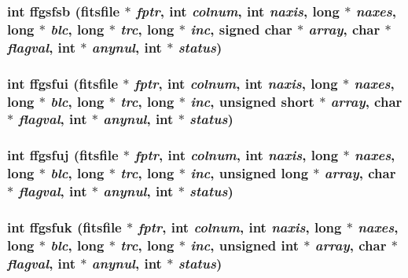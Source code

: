 \subsubsection{\setlength{\rightskip}{0pt plus 5cm}int ffgsfsb (\bf{fitsfile} $\ast$ {\em fptr}, int {\em colnum}, int {\em naxis}, long $\ast$ {\em naxes}, long $\ast$ {\em blc}, long $\ast$ {\em trc}, long $\ast$ {\em inc}, signed char $\ast$ {\em array}, char $\ast$ {\em flagval}, int $\ast$ {\em anynul}, int $\ast$ {\em status})}\label{test_2roimasker_2fitsio_8h_e824866f99503c243fed85e3cce3aaf4}


\subsubsection{\setlength{\rightskip}{0pt plus 5cm}int ffgsfui (\bf{fitsfile} $\ast$ {\em fptr}, int {\em colnum}, int {\em naxis}, long $\ast$ {\em naxes}, long $\ast$ {\em blc}, long $\ast$ {\em trc}, long $\ast$ {\em inc}, unsigned short $\ast$ {\em array}, char $\ast$ {\em flagval}, int $\ast$ {\em anynul}, int $\ast$ {\em status})}\label{test_2roimasker_2fitsio_8h_c591c8ea9be72a7c242e8f102f6ba3b4}


\subsubsection{\setlength{\rightskip}{0pt plus 5cm}int ffgsfuj (\bf{fitsfile} $\ast$ {\em fptr}, int {\em colnum}, int {\em naxis}, long $\ast$ {\em naxes}, long $\ast$ {\em blc}, long $\ast$ {\em trc}, long $\ast$ {\em inc}, unsigned long $\ast$ {\em array}, char $\ast$ {\em flagval}, int $\ast$ {\em anynul}, int $\ast$ {\em status})}\label{test_2roimasker_2fitsio_8h_60eb38f1f62e5060ffca964466dd248e}


\subsubsection{\setlength{\rightskip}{0pt plus 5cm}int ffgsfuk (\bf{fitsfile} $\ast$ {\em fptr}, int {\em colnum}, int {\em naxis}, long $\ast$ {\em naxes}, long $\ast$ {\em blc}, long $\ast$ {\em trc}, long $\ast$ {\em inc}, unsigned int $\ast$ {\em array}, char $\ast$ {\em flagval}, int $\ast$ {\em anynul}, int $\ast$ {\em status})}\label{test_2roimasker_2fitsio_8h_8c55ce0c3ac249a3b00043f7872099f4}


